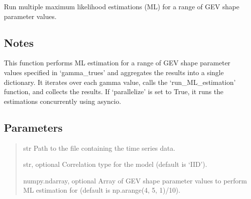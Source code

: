 \documentclass[a4paper,11pt,openany,english]{sphinxmanual}
\begin{document}
\begin{fulllineitems}
\label{\detokenize{api_topt:xtremes.topt.run_multiple_ML_estimations}}
\pysigstartsignatures
{}
\pysigstopsignatures
\sphinxAtStartPar
Run multiple maximum likelihood estimations (ML) for a range of GEV shape parameter values.


\subsection{Notes}
\label{\detokenize{api_topt:id94}}
\sphinxAtStartPar
This function performs ML estimation for a range of GEV shape parameter values specified in ‘gamma\_trues’ and aggregates the results into a single dictionary.
It iterates over each gamma value, calls the ‘run\_ML\_estimation’ function, and collects the results. If ‘parallelize’ is set to True, it runs the estimations
concurrently using asyncio.


\subsection{Parameters}
\label{\detokenize{api_topt:id95}}\begin{quote}\begin{description}
\sphinxAtStartPar
str
Path to the file containing the time series data.

\sphinxAtStartPar
str, optional
Correlation type for the model (default is ‘IID’).

\sphinxAtStartPar
numpy.ndarray, optional
Array of GEV shape parameter values to perform ML estimation for (default is np.arange(\sphinxhyphen{}4, 5, 1)/10).


\end{description}
\end{quote}
\end{fulllineitems}
\end{document}
